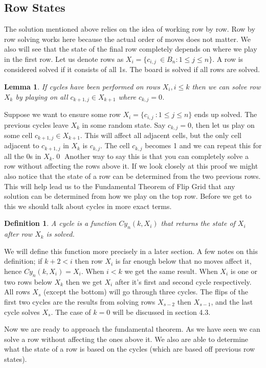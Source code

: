 \documentclass{article}
\newcommand{\cl}{\ensuremath{c_{i,j}}\:}
\newtheorem{lemma}[theorem]{Lemma}
\newtheorem{definition}{Definition}[subsection]
\begin{document}
  \subsection{Row States}
  The solution mentioned above relies on the idea of working row by row. Row by row solving works here because the actual order of moves does not matter. We also will see that the state of the final row completely depends on where we play in the first row. Let us denote rows as $X_i=\{\cl\in B_n:1\leq j\leq n\}$. A row is considered solved if it consists of all 1s. The board is solved if all rows are solved.
  \begin{lemma}
    If cycles have been performed on rows $X_i,i\leq k$ then we can solve row $X_k$ by playing on all $c_{k+1,j}\in X_{k+1}$ where $c_{k,j}=0$.
  \end{lemma}
  Suppose we want to ensure some row $X_i=\{\cl:1\leq j\leq n\}$ ends up solved. The previous cycles leave $X_k$ in some random state. Say $c_{k,j}=0$, then let us play on some cell $c_{k+1,j}\in X_{k+1}$. This will affect all adjacent cells, but the only cell adjacent to $c_{k+1,j}$ in $X_k$ is $c_{k,j}$. The cell $c_{k,j}$ becomes 1 and we can repeat this for all the 0s in $X_k$.\qed
  Another way to say this is that you can completely solve a row without affecting the rows above it. If we look closely at this proof we might also notice that the state of a row can be determined from the two previous rows. This will help lead us to the Fundamental Theorem of Flip Grid that any solution can be determined from how we play on the top row. Before we get to this we should talk about cycles in more exact terms.
  \begin{definition}
    A cycle is a function $Cy_n(k,X_i)$ that returns the state of $X_i$ after row $X_k$ is solved.
  \end{definition}
  We will define this function more precisely in a later section. A few notes on this definition; if $k+2<i$ then row $X_i$ is far enough below that no moves affect it, hence $Cy_n(k,X_i)=X_i$. When $i<k$ we get the same result. When $X_i$ is one or two rows below $X_k$ then we get $X_i$ after it's first and second cycle respectively. All rows $X_s$ (except the bottom) will go through three cycles. The flips of the first two cycles are the results from solving rows $X_{s-2}$ then $X_{s-1}$, and the last cycle solves $X_s$. The case of $k=0$ will be discussed in section 4.3.\par
  Now we are ready to approach the fundamental theorem. As we have seen we can solve a row without affecting the ones above it. We also are able to determine what the state of a row is based on the cycles (which are based off previous row states).
\end{document}
